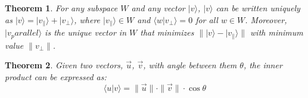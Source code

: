 \documentclass{amsbook}
\newtheorem{theorem}{Theorem}
\begin{document}
\begin{theorem}
\label{VectorDecomposition}
For any subspace $W$ and any vector $|v\rangle$, $|v\rangle$ can be written uniquely as $|v\rangle=|v_\parallel\rangle+|v_\bot\rangle$, where $|v_\parallel\rangle\in W$ and $\langle w|v_\bot\rangle=0$ for all $w\in W$.  Moreover, $|v_parallel\rangle$ is the unique vector in $W$ that minimizes $\| |v\rangle-|v_\parallel\rangle \|$ with minimum value $\|v_\bot\|$.
\end{theorem}

\begin{theorem}
\label{CosineSimilarity}
Given two vectors, $\vec u$, $\vec v$, with angle between them $\theta$, the inner product can be expressed as:
$$
\langle u|v\rangle = \|\vec u\|\cdot\|\vec v\|\cdot\cos\theta
$$
\end{theorem}
\end{document}
